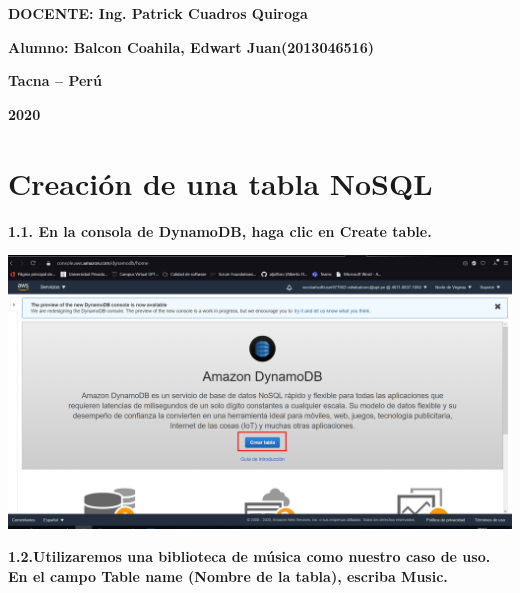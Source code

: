 \documentclass{article}
\begin{document}
\begin{titlepage}
\begin{center}
\vspace*{0.3in}
\begin{Large}
\textbf{DOCENTE: Ing. Patrick Cuadros Quiroga} \\
\end{Large}

\vspace*{0.2in}
\vspace*{0.1in}
\begin{large}

\begin{Large}
\textbf{Alumno: Balcon Coahila, Edwart Juan\hfill	(2013046516) } \\
\end{Large}

\vspace*{0.15in}
\begin{Large}
\textbf{Tacna – Perú} \\
\end{Large}

\vspace*{0.05in}
\begin{Large}
\textbf{2020 } \\
\end{Large}

\end{large}
\end{center}

\end{titlepage}


\newpage

\section{ Creación de una tabla NoSQL}

\textbf{1.1. En la consola de DynamoDB, haga clic en Create table.}

    \begin{center}
		\includegraphics[width=15cm]{./images/1} 
	\end{center}
	\newpage
\textbf{1.2.Utilizaremos una biblioteca de música como nuestro caso de uso.  En el campo Table name (Nombre de la tabla), escriba Music.}
\end{document}
